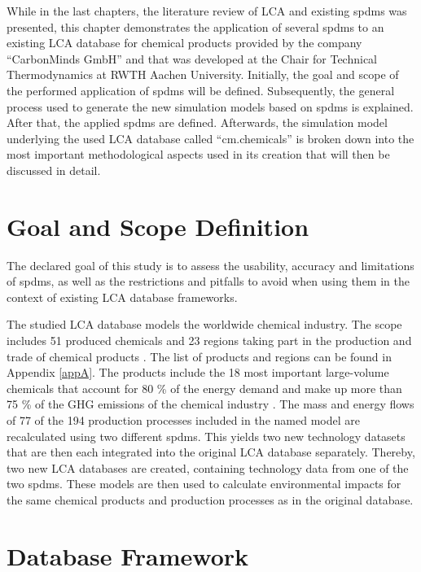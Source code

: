 \label{chap:case study}
While in the last chapters, the literature review of \ac{LCA} and existing \aclp{spdm} was presented, this chapter demonstrates the application of several \aclp{spdm} to an existing LCA database for chemical products provided by the company ``CarbonMinds GmbH''  \cite{CarbonMindsGmbH.2020} and that was developed at the Chair for Technical Thermodynamics at RWTH Aachen University. Initially, the goal and scope of the performed application of \aclp{spdm} will be defined. Subsequently, the general process used to generate the new simulation models based on \aclp{spdm} is explained. After that, the applied \aclp{spdm} are defined. Afterwards, the simulation model underlying the used LCA database called ``cm.chemicals'' \cite{CarbonMindsGmbH.2020} is broken down into the most important methodological aspects used in its creation that will then be discussed in detail. 

\section{Goal and Scope Definition}


The declared goal of this study is to assess the usability, accuracy and limitations of \aclp{spdm}, as well as the restrictions and pitfalls to avoid when using them in the context of existing LCA database frameworks.

The studied LCA database models the worldwide chemical industry. The scope includes 51 produced chemicals and 23 regions taking part in the production and trade of chemical products \cite{CarbonMindsGmbH.2020}. The list of products and regions can be found in Appendix \ref{appA}. The products include the 18 most important large-volume chemicals that account for 80 \% of the energy demand and make up more than 75 \% of the \acl{GHG} emissions of the chemical industry \cite{InternationalEnergyAgency.2013}. The mass and energy flows of 77 of the 194 production processes included in the named model are recalculated using two different \aclp{spdm}. This yields two new technology datasets that are then each integrated into the original LCA database separately. Thereby, two new LCA databases are created, containing technology data from one of the two \aclp{spdm}. These models are then used to calculate environmental impacts for the same chemical products and production processes as in the original database. 


\section{Database Framework}


